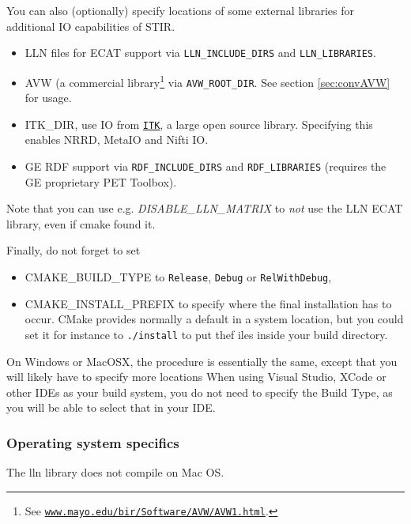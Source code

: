 \documentclass{article}
\def\R2Lurl#1#2{\mbox{\href{#1}{\tt #2}}}
\begin{document}
You can also (optionally) specify locations of some external libraries for additional IO
capabilities of STIR. 
\begin{itemize}
\item LLN files for ECAT support via \texttt{LLN\_INCLUDE\_DIRS} and \texttt{LLN\_LIBRARIES}.
\item AVW\texttrademark{} (a commercial library\footnote{See \R2Lurl{http://www.mayo.edu/bir/Software/AVW/AVW1.html}
{www.mayo.edu/bir/Software/AVW/AVW1.html}.}
via \texttt{AVW\_ROOT\_DIR}. See section \ref{sec:convAVW} for usage.
\item ITK\_DIR, use IO from \R2Lurl{http://www.itk.org}{ITK}, a large open source library. Specifying this
 enables NRRD, MetaIO and Nifti IO.
\item GE RDF\texttrademark{} support via \texttt{RDF\_INCLUDE\_DIRS} and \texttt{RDF\_LIBRARIES} (requires the GE proprietary PET Toolbox).
\end{itemize}

Note that you can use e.g. \textit{DISABLE\_LLN\_MATRIX} to \textit{not}
use the LLN ECAT library, even if cmake found it.

Finally, do not forget to set
\begin{itemize}
\item CMAKE\_BUILD\_TYPE to \texttt{Release}, \texttt{Debug} or \texttt{RelWithDebug},
\item CMAKE\_INSTALL\_PREFIX to specify where the final installation has to occur. CMake
provides normally a default in a system location, but you could set it for instance to
\texttt{./install} to put thef iles inside your build directory.
\end{itemize}

On Windows or MacOSX, the procedure is essentially the same, except that you will likely have 
to specify more locations When using Visual Studio, XCode or other IDEs as  your build system,
you do not need to specify the Build Type, as you will be able to select that in 
your IDE.



\subsubsection{
Operating system specifics}

{ 
}

The lln library does not compile on Mac OS. 

{ 
}
\end{document}
